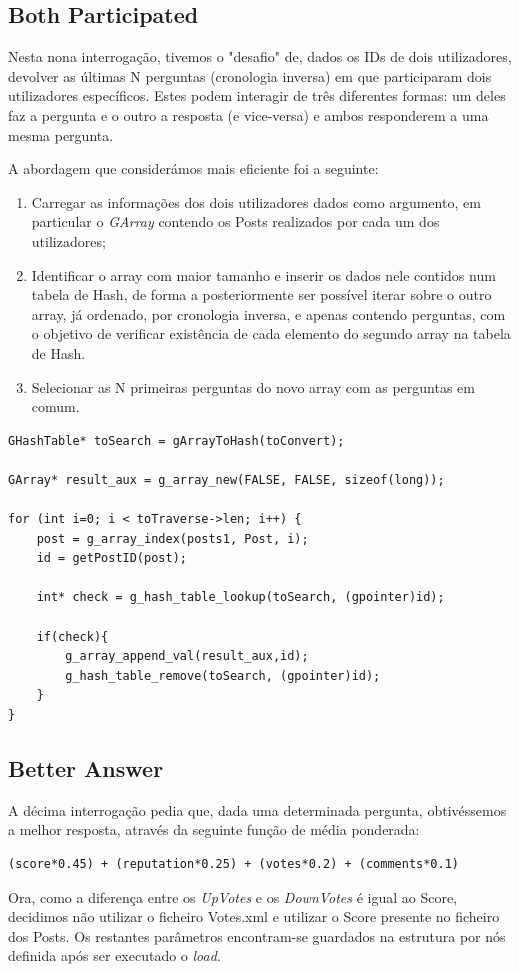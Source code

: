 \documentclass[a4paper, 11pt, oneside]{article}
\begin{document}
\subsection{Both Participated}
Nesta nona interrogação, tivemos o "desafio" de, dados os IDs de dois utilizadores, devolver as últimas N perguntas (cronologia inversa) em que participaram dois utilizadores específicos. Estes podem interagir de três diferentes formas: um deles faz a pergunta e o outro a resposta (e vice-versa) e ambos responderem a uma mesma pergunta.

A abordagem que considerámos mais eficiente foi a seguinte:
\begin{enumerate}
\item Carregar as informações dos dois utilizadores dados como argumento, em particular o \textit{GArray} contendo os Posts realizados por cada um dos utilizadores;
\item Identificar o array com maior tamanho e inserir os dados nele contidos num tabela de Hash, de forma a posteriormente ser possível iterar sobre o outro array, já ordenado, por cronologia inversa, e apenas contendo perguntas, com o objetivo de verificar existência de cada elemento do segundo array na tabela de Hash.	
\item Selecionar as N primeiras perguntas do novo array com as perguntas em comum.
\end{enumerate}
\begin{lstlisting}[caption=Query 9 - identificação dos Posts comuns aos dois utilizadores]
GHashTable* toSearch = gArrayToHash(toConvert);

GArray* result_aux = g_array_new(FALSE, FALSE, sizeof(long));

for (int i=0; i < toTraverse->len; i++) {
	post = g_array_index(posts1, Post, i);
	id = getPostID(post);
		
	int* check = g_hash_table_lookup(toSearch, (gpointer)id);

	if(check){
		g_array_append_val(result_aux,id);
		g_hash_table_remove(toSearch, (gpointer)id);
	}
}
\end{lstlisting}

\subsection{Better Answer}
A décima interrogação pedia que, dada uma determinada pergunta, obtivéssemos a melhor resposta, através da seguinte função de média ponderada:
\begin{verbatim}
(score*0.45) + (reputation*0.25) + (votes*0.2) + (comments*0.1)
\end{verbatim}
Ora, como a diferença entre os \textit{UpVotes} e os \textit{DownVotes} é igual ao Score, decidimos não utilizar o ficheiro Votes.xml e utilizar o Score presente no ficheiro dos Posts. Os restantes parâmetros encontram-se guardados na estrutura por nós definida após ser executado o \textit{load}.
\end{document}
